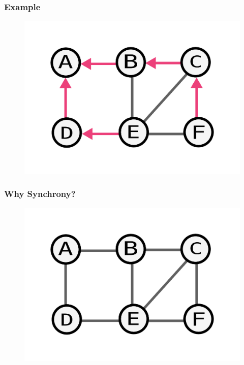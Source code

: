 \documentclass{beamer}
\begin{document}
\begin{frame}
    \frametitle{Example}
    \begin{figure}
    \includegraphics[width=0.5\paperwidth]{round3-end.pdf}
    \end{figure}
\end{frame}


\begin{frame}
    \frametitle{Why Synchrony?}
    \begin{figure}
    \includegraphics[width=0.5\paperwidth]{base.pdf}
    \end{figure}
\end{frame}
\end{document}
